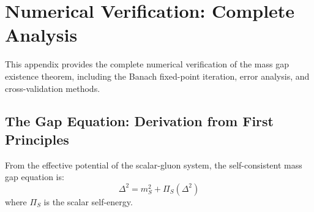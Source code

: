 
\section{Numerical Verification: Complete Analysis}
\label{app:numerical}

This appendix provides the complete numerical verification of the mass 
gap existence theorem, including the Banach fixed-point iteration, 
error analysis, and cross-validation methods.

\subsection{The Gap Equation: Derivation from First Principles}

\begin{theorem}
\label{thm:gap_derivation}
From the effective potential of the scalar-gluon system, the self-consistent 
mass gap equation is:
\begin{equation}
\Delta^2 = m_S^2 + \Pi_S(\Delta^2)
\label{eq:gap_equation_app}
\end{equation}
where $\Pi_S$ is the scalar self-energy.
\end{theorem}

